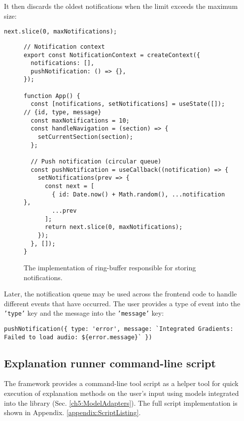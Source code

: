 \documentclass[
    bindingoffset=5mm,  %
    footnoteindent=3mm, %
    hyphenation=true    %
]{src/wut-thesis}
\begin{document}
It then discards the oldest notifications when the limit exceeds the maximum size:
\begin{verbatim}
next.slice(0, maxNotifications);
\end{verbatim}

\begin{figure}%
\begin{verbatim}
// Notification context
export const NotificationContext = createContext({
  notifications: [],
  pushNotification: () => {},
});

function App() {
  const [notifications, setNotifications] = useState([]); // {id, type, message}
  const maxNotifications = 10;
  const handleNavigation = (section) => {
    setCurrentSection(section);
  };

  // Push notification (circular queue)
  const pushNotification = useCallback((notification) => {
    setNotifications(prev => {
      const next = [
        { id: Date.now() + Math.random(), ...notification },
        ...prev
      ];
      return next.slice(0, maxNotifications);
    });
  }, []);
}
\end{verbatim}
\caption{The implementation of ring-buffer responsible for storing notifications.}
\label{fig:NotificationImpl}
\end{figure}

Later, the notification queue may be used across the frontend code to handle different
events that have occurred. The user provides a type of event into the \texttt{'type'} key and
the message into the \texttt{'message'} key:
\begin{verbatim}
pushNotification({ type: 'error', message: `Integrated Gradients: Failed to load audio: ${error.message}` })
\end{verbatim}

\clearpage %
\subsection{Explanation runner command-line script} \label{ch5:ExplanationRunner}

The framework provides a command-line tool script as a helper tool for quick execution
of explanation methods on the user’s input using models integrated into the library
(Sec. \ref{ch5:ModelAdapters}). The full script implementation
is shown in Appendix. \ref{appendix:ScriptListing}.
\end{document}

